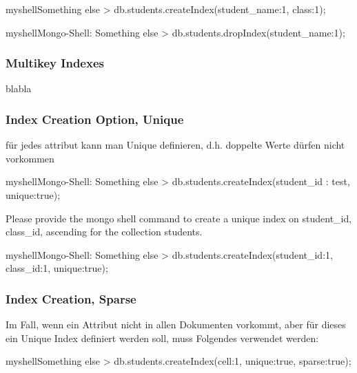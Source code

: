 \begin{listingsboxShell}[label={lst:X}]{myshell}{Something else}
> db.students.createIndex({student\_name:1, class:1});
\end{listingsboxShell}

\begin{listingsboxShell}[label={lst:X}]{myshell}{Mongo-Shell: Something else}
> db.students.dropIndex({student_name:1});
\end{listingsboxShell}

\subsubsection{Multikey Indexes}
blabla
\subsubsection{Index Creation Option, Unique}
für jedes attribut kann man Unique definieren, d.h. doppelte Werte dürfen nicht vorkommen\newline\newline

\begin{listingsboxShell}[label={lst:X}]{myshell}{Mongo-Shell: Something else}
> db.students.createIndex({student_id : test}, {unique:true});
\end{listingsboxShell}

Please provide the mongo shell command to create a unique index on student\_id, class\_id, ascending for the collection students.

\begin{listingsboxShell}[label={lst:X}]{myshell}{Mongo-Shell: Something else}
> db.students.createIndex({student_id:1, class_id:1}, {unique:true});
\end{listingsboxShell}

\subsubsection{Index Creation, Sparse}

Im Fall, wenn ein Attribut nicht in allen Dokumenten vorkommt, aber für dieses ein Unique Index definiert werden soll, muss Folgendes verwendet werden:

\begin{listingsboxShell}[label={lst:X}]{myshell}{Something else}
> db.students.createIndex({cell:1}, {unique:true, sparse:true});
\end{listingsboxShell}

